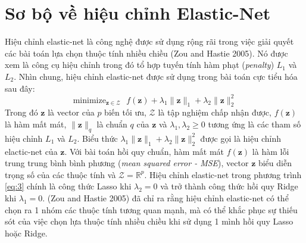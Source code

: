 \section{Sơ bộ về hiệu chỉnh Elastic-Net}
Hiệu chỉnh elastic-net là công nghệ được sử dụng rộng rãi trong việc giải quyết 
các bài toán lựa chọn thuộc tính nhiều chiều (Zou and Hastie 2005). Nó được xem 
là công cụ hiệu chỉnh trong đó tổ hợp tuyến tính hàm phạt (\textit{penalty})
$L_1$ và $L_2$. Nhìn chung, hiệu chỉnh elastic-net được sử dụng trong bài toán cực 
tiểu hóa sau đây:
\begin{equation}
    \label{eq:3}
    \text{minimize}_{\mathbf{z} \in \mathcal{Z}} \text{ }
    f(\mathbf{z}) + \lambda_1 \lVert \mathbf{z} \rVert_1
    + \lambda_2 \lVert \mathbf{z} \rVert_2^2
\end{equation}
Trong đó $\mathbf{z}$ là vector của $p$ biến tối ưu, $\mathcal{Z}$ là tập nghiệm 
chấp nhận được, $f(\mathbf{z})$ là hàm mất mát, $\lVert \mathbf{z} \rVert_q$ là 
chuẩn $q$ của $\mathbf{z}$ và $\lambda_1, \lambda_2 \geq 0$ tương ứng là các tham số hiệu 
chỉnh $L_1$ và $L_2$. Biểu thức $\lambda_1 \lVert \mathbf{z} \rVert_1 + \lambda_2 
\lVert \mathbf{z} \rVert_2^2$ được gọi là hiệu chỉnh elactic-net của $\mathbf{z}$.
Với bài toán hồi quy chuẩn, hàm mất mát $f(\mathbf{z})$ là hàm lỗi trung trung bình
bình phương (\textit{mean squared error - MSE}), vector $\mathbf{z}$ biểu diễn trọng 
số của các thuộc tính và $\mathcal{Z} = \mathbb{R}^p$. Hiệu chỉnh elastic-net trong 
phương trình \ref{eq:3} chính là công thức Lasso khi $\lambda_2 = 0$ và trở thành công 
thức hồi quy Ridge khi $\lambda_1 = 0$. (Zou and Hastie 2005) đã chỉ ra rằng hiệu chỉnh 
elastic-net có thể chọn ra 1 nhóm các thuộc tính tương quan mạnh, mà có thể khắc phục sự 
thiếu sót của việc chọn lựa thuộc tính nhiều chiều khi sử dụng 1 mình hồi quy Lasso 
hoặc Ridge.